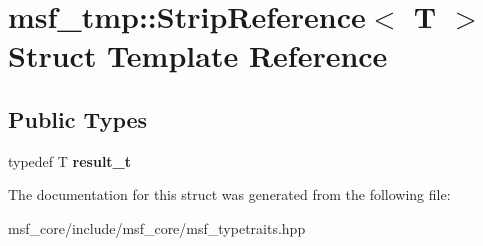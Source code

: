 \hypertarget{structmsf__tmp_1_1StripReference}{\section{msf\-\_\-tmp\-:\-:Strip\-Reference$<$ T $>$ Struct Template Reference}
\label{structmsf__tmp_1_1StripReference}
}
\subsection*{Public Types}
\begin{DoxyCompactItemize}
\item 
\hypertarget{structmsf__tmp_1_1StripReference_a3e5488373eb6358b4b30fc3386bb50a5}{typedef T {\bfseries result\-\_\-t}}\label{structmsf__tmp_1_1StripReference_a3e5488373eb6358b4b30fc3386bb50a5}

\end{DoxyCompactItemize}


The documentation for this struct was generated from the following file\-:\begin{DoxyCompactItemize}
\item 
msf\-\_\-core/include/msf\-\_\-core/msf\-\_\-typetraits.\-hpp\end{DoxyCompactItemize}
